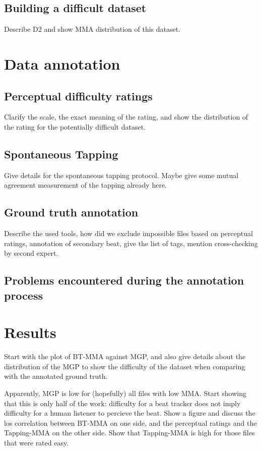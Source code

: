 \documentclass[10pt,journal,final,twocolumn,twoside]{IEEEtran}
\begin{document}
\subsection{Building a difficult dataset}
Describe D2 and show MMA distribution of this dataset.

\section{Data annotation}
\subsection{Perceptual difficulty ratings}
Clarify the scale, the exact meaning of the rating, and show the distribution of the rating for the potentially difficult dataset.
\subsection{Spontaneous Tapping}
Give details for the spontaneous tapping protocol. Maybe give some mutual agreement measurement of the tapping already here.
\subsection{Ground truth annotation}
Describe the used tools, how did we exclude impossible files based on perceptual ratings, annotation of secondary beat, give the list of tags, mention cross-checking by second expert.
\subsection{Problems encountered during the annotation process}

\section{Results}
Start with the plot of BT-MMA against MGP, and also give details about the distribution of the MGP to show the difficulty of the dataset when comparing with the annotated ground truth.

Apparently, MGP is low for (hopefully) all files with low MMA. Start showing that this is only half of the work: difficulty for a beat tracker does not imply difficulty for a human listener to percieve the beat. Show a figure and discuss the los correlation between BT-MMA on one side, and the perceptual ratings and the Tapping-MMA on the other side. Show that Tapping-MMA is high for those files that were rated easy.
\end{document}
